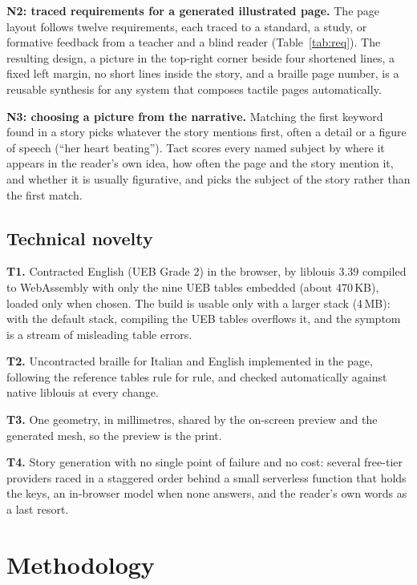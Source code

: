 \documentclass[conference]{IEEEtran}
\begin{document}
\textbf{N2: traced requirements for a generated illustrated page.} The page layout follows twelve requirements, each traced to a standard, a study, or formative feedback from a teacher and a blind reader (Table~\ref{tab:req}). The resulting design, a picture in the top-right corner beside four shortened lines, a fixed left margin, no short lines inside the story, and a braille page number, is a reusable synthesis for any system that composes tactile pages automatically.

\textbf{N3: choosing a picture from the narrative.} Matching the first keyword found in a story picks whatever the story mentions first, often a detail or a figure of speech (``her heart beating''). Tact scores every named subject by where it appears in the reader's own idea, how often the page and the story mention it, and whether it is usually figurative, and picks the subject of the story rather than the first match.

\subsection{Technical novelty}

\textbf{T1.} Contracted English (UEB Grade 2) in the browser, by liblouis 3.39 compiled to WebAssembly with only the nine UEB tables embedded (about 470\,KB), loaded only when chosen. The build is usable only with a larger stack (4\,MB): with the default stack, compiling the UEB tables overflows it, and the symptom is a stream of misleading table errors.

\textbf{T2.} Uncontracted braille for Italian and English implemented in the page, following the reference tables rule for rule, and checked automatically against native liblouis at every change.

\textbf{T3.} One geometry, in millimetres, shared by the on-screen preview and the generated mesh, so the preview is the print.

\textbf{T4.} Story generation with no single point of failure and no cost: several free-tier providers raced in a staggered order behind a small serverless function that holds the keys, an in-browser model when none answers, and the reader's own words as a last resort.

\section{Methodology}\label{sec:method}
\end{document}
